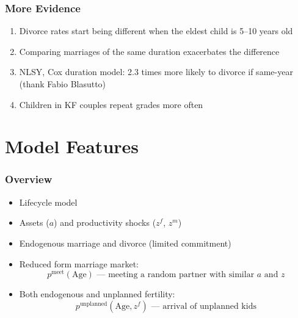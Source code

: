 \documentclass{beamer}
\begin{document}
\begin{frame}
\frametitle{More Evidence}
\begin{enumerate}
\item Divorce rates start being different when the eldest child is 5--10 years old
\item Comparing marriages of the same duration exacerbates the difference
\item NLSY, Cox duration model: 2.3 times more likely to divorce if same-year (thank Fabio Blasutto)
\item Children in KF couples repeat grades more often
\end{enumerate}
\end{frame}



\section{Model Features}

\begin{frame}
\frametitle{Overview}
\begin{itemize}
\item Lifecycle model
\item Assets ($a$) and productivity shocks ($z^f$, $z^m$)
\item Endogenous marriage and divorce (limited commitment)
\item Reduced form marriage market:
\[p^{\text{meet}}(\text{Age}) \text{ --- meeting a random partner with similar $a$ and $z$}\]
\item Both endogenous and unplanned fertility:
\[p^{\text{unplanned}}(\text{Age},z^f) \text{ --- arrival of unplanned kids}\]
\end{itemize}
\end{frame}
\end{document}
